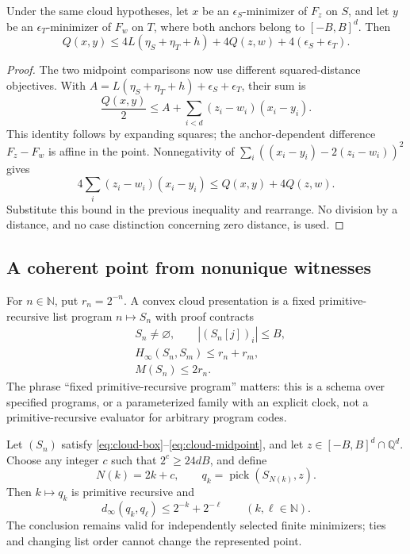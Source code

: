 \begin{theorem}
\label{thm:cloud-moving-anchor}
Under the same cloud hypotheses, let \(x\) be an
\(\epsilon_S\)-minimizer of \(F_z\) on \(S\), and let \(y\) be an
\(\epsilon_T\)-minimizer of \(F_w\) on \(T\), where both anchors belong
to \([-B,B]^d\).  Then
\begin{equation}
 \label{eq:cloud-anchor}
 Q(x,y)\leq
 4L(\eta_S+\eta_T+h)+4Q(z,w)+4(\epsilon_S+\epsilon_T).
\end{equation}
\end{theorem}

\begin{proof}
The two midpoint comparisons now use different squared-distance objectives.
With \(A=L(\eta_S+\eta_T+h)+\epsilon_S+\epsilon_T\), their sum is
\[
 \frac{Q(x,y)}2
 \leq A+\sum_{i<d}(z_i-w_i)(x_i-y_i).
\]
This identity follows by expanding squares; the anchor-dependent difference
\(F_z-F_w\) is affine in the point.  Nonnegativity of
\(\sum_i((x_i-y_i)-2(z_i-w_i))^2\) gives
\[
 4\sum_i(z_i-w_i)(x_i-y_i)\leq Q(x,y)+4Q(z,w).
\]
Substitute this bound in the previous inequality and rearrange.
No division by a distance, and no case distinction concerning zero distance,
is used.
\end{proof}

\subsection{A coherent point from nonunique witnesses}

For \(n\in\mathbb N\), put \(r_n=2^{-n}\).  A convex cloud
presentation is a fixed primitive-recursive list program \(n\mapsto S_n\)
with proof contracts
\begin{align}
 &S_n\ne\varnothing,\qquad |(S_n[j])_i|\leq B,\label{eq:cloud-box}\\
 &H_\infty(S_n,S_m)\leq r_n+r_m,\label{eq:cloud-cauchy}\\
 &M(S_n)\leq2r_n.\label{eq:cloud-midpoint}
\end{align}
The phrase ``fixed primitive-recursive program'' matters: this is a schema
over specified programs, or a parameterized family with an explicit clock,
not a primitive-recursive evaluator for arbitrary program codes.

\begin{theorem}
\label{thm:convex-cloud-selector}
Let \((S_n)\) satisfy \eqref{eq:cloud-box}--\eqref{eq:cloud-midpoint},
and let \(z\in[-B,B]^d\cap\mathbb Q^d\).  Choose any integer \(c\)
such that \(2^c\geq24dB\), and define
\[
 N(k)=2k+c,\qquad
 q_k=\operatorname{pick}(S_{N(k)},z).
\]
Then \(k\mapsto q_k\) is primitive recursive and
\begin{equation}
 \label{eq:cloud-name}
 d_\infty(q_k,q_\ell)\leq2^{-k}+2^{-\ell}
 \qquad(k,\ell\in\mathbb N).
\end{equation}
The conclusion remains valid for independently selected finite minimizers;
ties and changing list order cannot change the represented point.
\end{theorem}

